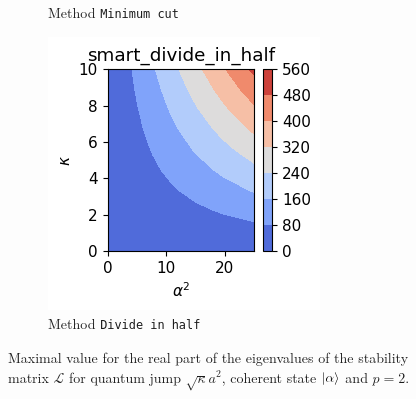 \begin{figure}[h!]
\begin{subfigure}{0.32\linewidth}
        \caption{Method \texttt{Minimum cut}}
        \label{fig:H_0_and_losses_2_p_2_rule_min-cut}
    \end{subfigure}
    \hfill
    \begin{subfigure}{0.32\linewidth}
        \centering
        \includegraphics[width=\linewidth]{Pics/H_0_and_losses_2_p_2_rule_smart_divide_in_half.pdf}
        \caption{Method \texttt{Divide in half}}
        \label{fig:H_0_and_losses_2_p_2_rule_smart_divide_in_half}
    \end{subfigure}
    \caption{Maximal value for the real part of the eigenvalues of the stability matrix $\mathcal{L}$ for quantum jump $\sqrt{\kappa} a^2$, coherent state $\ket{\alpha}$ and $p=2$.}
    \label{fig:CompStab2Loss}
\end{figure}